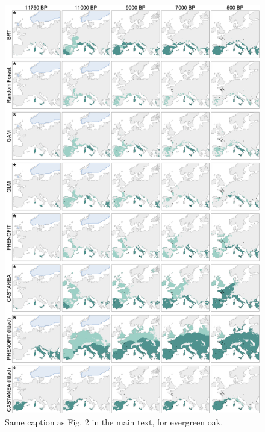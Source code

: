 \documentclass[pdflatex, sn-nature, oneside]{sn-jnl}%
\begin{document}
\begin{figure}
\hspace*{-.3in}
\centering
\includegraphics{quercusevergreen_simulations-1.pdf}
\caption{Same caption as Fig. 2 in the main text, for evergreen oak.}
\end{figure}
\end{document}

